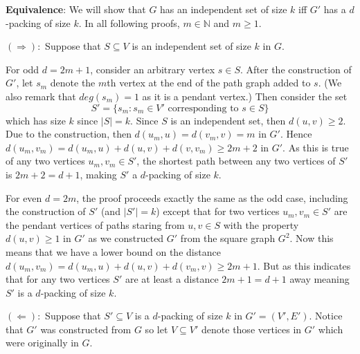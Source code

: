 \documentclass[10pt, a4paper]{article}
\theoremstyle{definition}
\newcommand{\N}{\mathbb{N}}
\begin{document}
\textbf{Equivalence}: We will show that $G$ has an independent set of size $k$ iff $G'$ has a $d$-packing of size $k$.  In all following proofs, $m \in \N$ and $m \geq 1$.

$(\Rightarrow):$ Suppose that $S \subseteq V$ is an independent set of size $k$ in $G$.

For odd $d = 2m+1$, consider an arbitrary vertex $s \in S$. After the construction of $G'$, let $s_m$ denote the $m$th vertex at the end of the path graph added to $s$. (We also remark that $deg(s_m) = 1$ as it is a pendant vertex.) Then consider the set
\[ S' = \{ s_m : s_m \in V' \text{ corresponding to } s \in S \}\]
which has size $k$ since $|S| = k$.
Since $S$ is an independent set, then $d(u,v) \geq 2$. Due to the construction, then $d(u_m,u) = d(v_m,v) = m$ in $G'$. Hence $d(u_m,v_m) = d(u_m,u) + d(u,v) + d(v,v_m) \geq 2m + 2$ in $G'$. As this is true of any two vertices $u_m, v_m \in S'$, the shortest path between any two vertices of $S'$ is $2m+2 = d+ 1$, making $S'$ a $d$-packing of size $k$.

For even $d = 2m$, the proof proceeds exactly the same as the odd case, including the construction of $S'$ (and $|S'| = k$) except that for two vertices $u_m, v_m \in S'$ are the pendant vertices of paths staring from $u, v \in S$ with the property $d(u,v) \geq 1$ in $G'$ as we constructed $G'$ from the square graph $G^2$. Now this means that we have a lower bound on the distance $d(u_m,v_m) = d(u_m,u) + d(u,v) + d(v_m,v) \geq 2m + 1$. But as this indicates that for any two vertices $S'$ are at least a distance $2m + 1 = d+1$ away meaning $S'$ is a $d$-packing of size $k$.

$(\Leftarrow):$ Suppose that $S' \subseteq V$ is a $d$-packing of size $k$ in $G' = (V', E')$. Notice that $G'$ was constructed from $G$ so let $V \subseteq V'$ denote those vertices in $G'$ which were originally in $G$.
\end{document}
